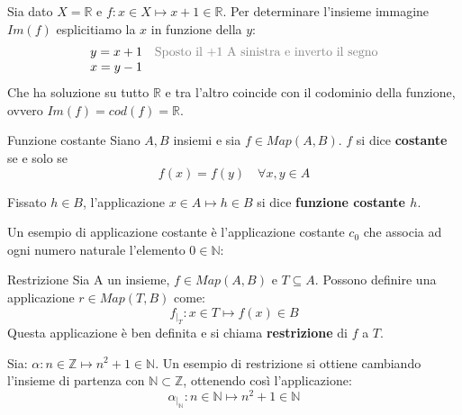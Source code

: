 \begin{example}
	Sia dato $X=\mathbb{R}$ e $f:x \in X \mapsto x+1 \in \mathbb{R}$. Per determinare l'insieme immagine $Im(f)$ esplicitiamo la $x$ in funzione della $y$:
	\begin{displaymath}
		\begin{array}{ll}
			y = x+1 & \text{\textcolor{gray}{Sposto il $+1$ A sinistra e inverto il segno}} \\
			x = y-1 &                                                                       \\
		\end{array}
	\end{displaymath}
	Che ha soluzione su tutto $\mathbb{R}$ e tra l'altro coincide con il codominio della funzione, ovvero $Im(f)= cod(f)=\mathbb{R}$.
\end{example}


\begin{defbox}{Funzione costante}
	Siano $A,B$ insiemi e sia $f \in Map(A,B)$. $f$ si dice \textbf{costante} se e solo se
	\begin{equation}
		f(x)=f(y) \quad \forall x,y \in A
	\end{equation}
	
	Fissato $h \in B$, l'applicazione $x \in A \mapsto h \in B$ si dice \textbf{funzione costante $h$}.
\end{defbox}

\begin{example}
	Un esempio di applicazione costante è l'applicazione costante $c_{0}$ che associa ad ogni numero naturale l'elemento $0 \in \mathbb{N}$:
\end{example}


\begin{defbox}{Restrizione}
	Sia A un insieme, $f \in Map(A,B)$ e $T \subseteq A$. Possono definire una applicazione $r \in Map(T,B)$ come:
	\begin{equation}
		f_{\vert_{T}}:	x \in T \mapsto f(x) \in B
	\end{equation}
	Questa applicazione è ben definita e si chiama \textbf{restrizione} di $f$ a $T$.
\end{defbox}


\begin{example}
	Sia: $\alpha: n \in \mathbb{Z} \mapsto n^{2}+1 \in \mathbb{N}$.	Un esempio di restrizione si ottiene cambiando l'insieme di partenza con $\mathbb{N} \subset \mathbb{Z}$, ottenendo così l'applicazione:
	\begin{displaymath}
		\alpha_{\vert_{\mathbb{N}}}: n \in \mathbb{N} \mapsto n^{2}+1 \in \mathbb{N}
	\end{displaymath}
\end{example}


